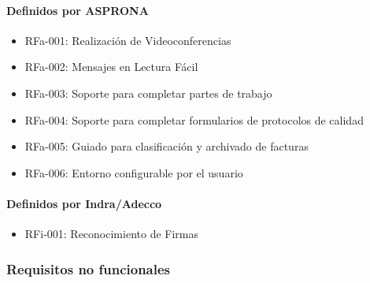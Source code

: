 \paragraph{Definidos por ASPRONA}
\begin{itemize}
\item RFa-001: Realización de Videoconferencias
\item RFa-002: Mensajes en Lectura Fácil
\item RFa-003: Soporte para completar partes de trabajo
\item RFa-004: Soporte para completar formularios de protocolos de calidad
\item RFa-005: Guiado para clasificación y archivado de facturas
\item RFa-006: Entorno configurable por el usuario
\end{itemize}
\paragraph{Definidos por Indra/Adecco}
\begin{itemize}
\item RFi-001: Reconocimiento de Firmas
\end{itemize}
\subsubsection{Requisitos no funcionales}

